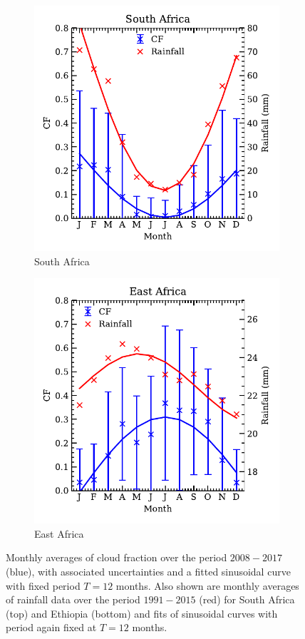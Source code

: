 \begin{figure}
  \begin{subfigure}{\linewidth}
    \centering
    \includegraphics[width=0.85\linewidth]{figures/cf_rainfall_capetown}
    \caption{South Africa}
    \label{fig:cf_rf_south}
  \end{subfigure}
  \begin{subfigure}{\linewidth}
    \centering
    \includegraphics[width=0.85\linewidth]{figures/cf_rainfall_eastafrica}
    \caption{East Africa}
    \label{fig:cf_rf_east}
  \end{subfigure}
  \caption{Monthly averages of cloud fraction over the period
    $2008-2017$ (blue), with associated uncertainties and a fitted
    sinusoidal curve with fixed period $T=12$ months. Also shown are
    monthly averages of rainfall data over the period $1991-2015$
    (red) for South Africa (top) and Ethiopia (bottom) and fits of
    sinusoidal curves with period again fixed at $T=12$ months.}
  \label{fig:cf_rf}
\end{figure}

